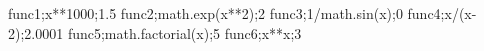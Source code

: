 func1;x**1000;1.5
func2;math.exp(x**2);2
func3;1/math.sin(x);0
func4;x/(x-2);2.0001
func5;math.factorial(x);5
func6;x**x;3